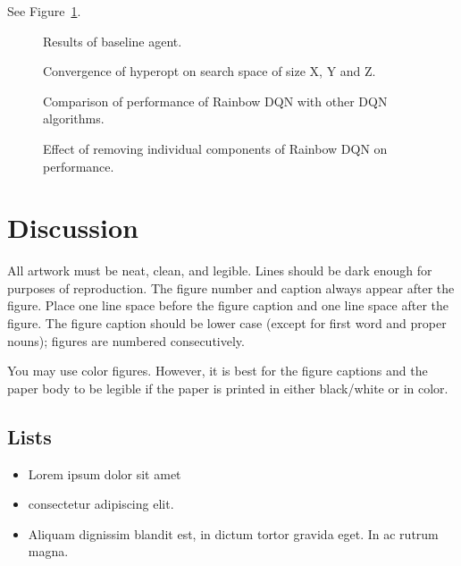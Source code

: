 \documentclass{article}
\begin{document}
\lipsum[7]
See Figure~\ref{fig:fig1}.

\begin{figure}
  \centering
  \fbox{\rule[-.5cm]{0cm}{4cm} \rule[-.5cm]{4cm}{0cm}}
  \caption{Results of baseline agent.}
  \label{fig:fig1}
\end{figure}

\begin{figure}
  \centering
  \fbox{\rule[-.5cm]{0cm}{4cm} \rule[-.5cm]{4cm}{0cm}}
  \caption{Convergence of hyperopt on search space of size X, Y and Z.}
  \label{fig:fig2}
\end{figure}

\begin{figure}
  \centering
  \fbox{\rule[-.5cm]{0cm}{4cm} \rule[-.5cm]{4cm}{0cm}}
  \caption{Comparison of performance of Rainbow DQN with other DQN algorithms.}
  \label{fig:fig3}
\end{figure}

\begin{figure}
  \centering
  \fbox{\rule[-.5cm]{0cm}{4cm} \rule[-.5cm]{4cm}{0cm}}
  \caption{Effect of removing individual components of Rainbow DQN on performance.}
  \label{fig:fig4}
\end{figure}

\section{Discussion}


All artwork must be neat, clean, and legible. Lines should be dark enough for
purposes of reproduction. The figure number and caption always appear after the
figure. Place one line space before the figure caption and one line space after
the figure. The figure caption should be lower case (except for first word and
proper nouns); figures are numbered consecutively.

You may use color figures.  However, it is best for the figure captions and the
paper body to be legible if the paper is printed in either black/white or in
color.

\subsection{Lists}

\begin{itemize}
  \item Lorem ipsum dolor sit amet
  \item consectetur adipiscing elit.
  \item Aliquam dignissim blandit est, in dictum tortor gravida eget. In ac rutrum magna.
\end{itemize}
\end{document}

